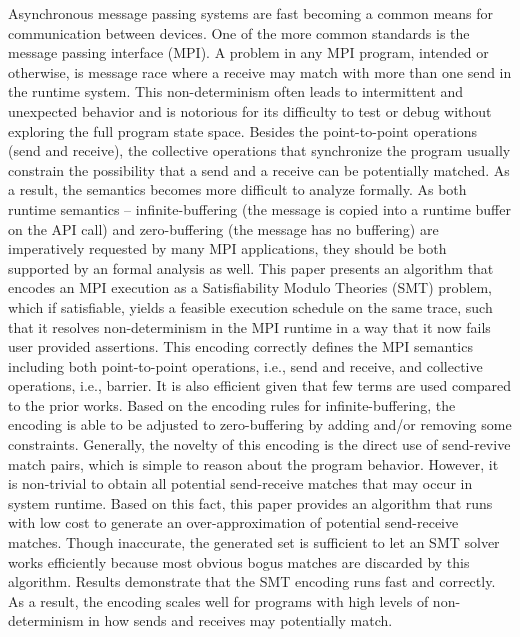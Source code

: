Asynchronous message passing systems are fast becoming a common means for communication between devices.
%
One of the more common standards is the message passing interface (MPI).
%
A problem in any MPI program, intended or otherwise, is message race where a receive may match with more than one send in the runtime system.
%
This non-determinism often leads to intermittent and unexpected behavior and is notorious for its difficulty to test or debug without exploring the full program state space. 
%
Besides the point-to-point operations (send and receive), the collective operations that synchronize the program usually constrain the possibility that a send and a receive can be potentially matched. 
%
As a result, the semantics becomes more difficult to analyze formally. 
%
As both runtime semantics -- infinite-buffering (the message is copied into a runtime buffer on the API call) and zero-buffering (the message has no buffering) are imperatively requested by many MPI applications, they should be both supported by an formal analysis as well. 
%
This paper presents an algorithm that encodes an MPI execution as a Satisfiability Modulo Theories (SMT) problem, which if satisfiable, yields a feasible execution schedule on the same trace, such that it resolves non-determinism in the MPI runtime in a way that it now fails user provided assertions.
%
This encoding correctly defines the MPI semantics including both point-to-point operations, i.e., send and receive, and collective operations, i.e., barrier.
%
It is also efficient given that few terms are used compared to the prior works.
%
Based on the encoding rules for infinite-buffering, the encoding is able to be adjusted to zero-buffering by adding and/or removing some constraints.
%
Generally, the novelty of this encoding is the direct use of send-revive match pairs, which is simple to reason about the program behavior. 
%
However, it is non-trivial to obtain all potential send-receive matches that may occur in system runtime.
%
Based on this fact, this paper provides an algorithm that runs with low cost to generate an over-approximation of potential send-receive matches. 
%
Though inaccurate, the generated set is sufficient to let an SMT solver works efficiently because most obvious bogus matches are discarded by this algorithm.
%
Results demonstrate that the SMT encoding runs fast and correctly. 
%
As a result, the encoding scales well for programs with high levels of non-determinism in how sends and receives may potentially match.